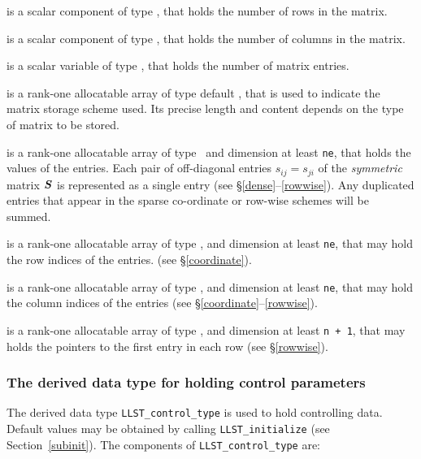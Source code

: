 \documentclass{galahad}
\newcommand{\packagename}{LLST}
\begin{document}
\begin{description}

 is a scalar component of type \integer,
that holds the number of rows in the matrix.

 is a scalar component of type \integer,
that holds the number of columns in the matrix.

 is a scalar variable of type \integer, that
holds the number of matrix entries.

 is a rank-one allocatable array of type default \character, that
is used to indicate the matrix storage scheme used. Its precise length and
content depends on the type of matrix to be stored.

 is a rank-one allocatable array of type \realdp\,
and dimension at least {\tt ne}, that holds the values of the entries.
Each pair of off-diagonal entries $s_{ij} = s_{ji}$ of the {\em symmetric}
matrix ${\bm{S}}$ is represented as a single entry
(see \S\ref{dense}--\ref{rowwise}).
Any duplicated entries that appear in the sparse
co-ordinate or row-wise schemes will be summed.

 is a rank-one allocatable array of type \integer,
and dimension at least {\tt ne}, that may hold the row indices of the entries.
(see \S\ref{coordinate}).

 is a rank-one allocatable array of type \integer,
and dimension at least {\tt ne}, that may hold the column indices of the entries
(see \S\ref{coordinate}--\ref{rowwise}).

 is a rank-one allocatable array of type \integer,
and dimension at least {\tt n + 1}, that may holds the pointers to
the first entry in each row (see \S\ref{rowwise}).

\end{description}


\subsubsection{The derived data type for holding control
 parameters}\label{typecontrol}
The derived data type
{\tt \packagename\_control\_type}
is used to hold controlling data. Default values may be obtained by calling
{\tt \packagename\_initialize}
(see Section~\ref{subinit}). The components of
{\tt \packagename\_control\_type}
are:
\end{document}
